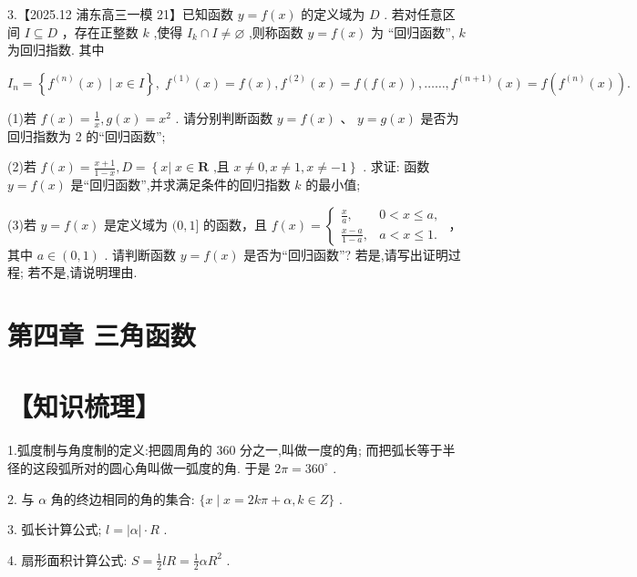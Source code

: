 \documentclass[10pt]{article}
\begin{document}
3.【2025.12 浦东高三一模 21】已知函数 \(y = f\left( x\right)\) 的定义域为 \(D\) . 若对任意区间 \(I \subseteq  D\) ，存在正整数 \(k\) ,使得 \({I}_{k} \cap  I \neq  \varnothing\) ,则称函数 \(y = f\left( x\right)\) 为 “回归函数”, \(k\) 为回归指数. 其中

\[
{I}_{n} = \left\{  {{f}^{\left( n\right) }\left( x\right)  \mid  x \in  I}\right\}  ,\;{f}^{\left( 1\right) }\left( x\right)  = f\left( x\right) ,{f}^{\left( 2\right) }\left( x\right)  = f\left( {f\left( x\right) }\right) ,\ldots \ldots ,{f}^{\left( n + 1\right) }\left( x\right)  = f\left( {{f}^{\left( n\right) }\left( x\right) }\right) .
\]

(1)若 \(f\left( x\right)  = \frac{1}{x},g\left( x\right)  = {x}^{2}\) . 请分别判断函数 \(y = f\left( x\right) \text{ 、 }y = g\left( x\right)\) 是否为回归指数为 2 的“回归函数”;

(2)若 \(f\left( x\right)  = \frac{x + 1}{1 - x},D = \left\{  {x\left| {\;x \in  \mathbf{R}}\right. \text{ ,且 }x \neq  0,x \neq  1,x \neq   - 1}\right\}\) . 求证: 函数 \(y = f\left( x\right)\) 是“回归函数”,并求满足条件的回归指数 \(k\) 的最小值;

(3)若 \(y = f\left( x\right)\) 是定义域为 \((0,1\rbrack\) 的函数，且 \(f\left( x\right)  = \left\{  \begin{array}{ll} \frac{x}{a}, & 0 < x \leq  a, \\  \frac{x - a}{1 - a}, & a < x \leq  1. \end{array}\right.\) ，其中 \(a \in  \left( {0,1}\right)\) . 请判断函数 \(y = f\left( x\right)\) 是否为“回归函数”? 若是,请写出证明过程; 若不是,请说明理由.

\section*{第四章 三角函数}

\section*{【知识梳理】}

1.弧度制与角度制的定义:把圆周角的 360 分之一,叫做一度的角; 而把弧长等于半径的这段弧所对的圆心角叫做一弧度的角. 于是 \({2\pi } = {360}^{ \circ  }\) .

2. 与 \(\alpha\) 角的终边相同的角的集合: \(\{ x \mid  x = {2k\pi } + \alpha ,k \in  Z\}\) .

3. 弧长计算公式; \(l = \left| \alpha \right|  \cdot  R\) .

4. 扇形面积计算公式: \(S = \frac{1}{2}{lR} = \frac{1}{2}\alpha {R}^{2}\) .
\end{document}
